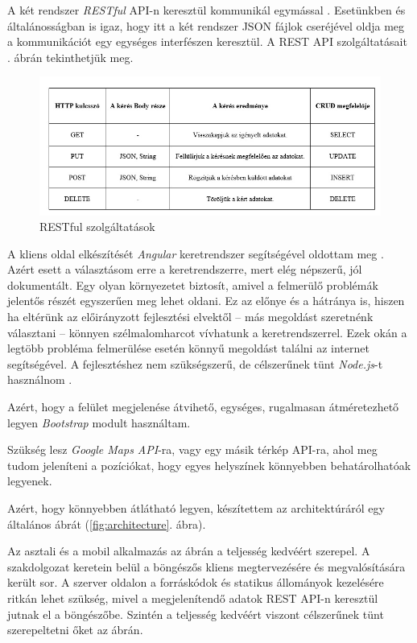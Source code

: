
A két rendszer \textit{RESTful} API-n keresztül kommunikál egymással \cite{8}. Esetünkben és általánosságban is igaz, hogy itt a két rendszer JSON fájlok cseréjével oldja meg a kommunikációt egy egységes interfészen keresztül.
A REST API szolgáltatásait . ábrán tekinthetjük meg.

\begin{figure}
\centering
\includegraphics[scale=0.75]{kepek/rest.jpg}
\caption{RESTful szolgáltatások}
\label{fig:rest}
\end{figure}


A kliens oldal elkészítését \textit{Angular} keretrendszer segítségével oldottam meg \cite{4}. Azért esett a választásom erre a keretrendszerre, mert elég népszerű, jól dokumentált. Egy olyan környezetet biztosít, amivel a felmerülő problémák jelentős részét egyszerűen meg lehet oldani. Ez az előnye és a hátránya is, hiszen ha eltérünk az előirányzott fejlesztési elvektől -- más megoldást szeretnénk választani -- könnyen szélmalomharcot vívhatunk a keretrendszerrel. Ezek okán a legtöbb probléma felmerülése esetén könnyű megoldást találni az internet segítségével. A fejlesztéshez nem szükségszerű, de célszerűnek tünt \textit{Node.js}-t használnom \cite{17}.

Azért, hogy a felület megjelenése átvihető, egységes, rugalmasan átméretezhető legyen \textit{Bootstrap} modult használtam.

Szükség lesz \textit{Google Maps API}-ra, vagy egy másik térkép API-ra, ahol meg tudom jeleníteni a pozíciókat, hogy egyes helyszínek könnyebben behatárolhatóak legyenek.


Azért, hogy könnyebben átlátható legyen, készítettem az architektúráról egy általános ábrát (\ref{fig:architecture}. ábra).

Az asztali és a mobil alkalmazás az ábrán a teljesség kedvéért szerepel. A szakdolgozat keretein belül a böngészős kliens megtervezésére és megvalósítására került sor. A szerver oldalon a forráskódok és statikus állományok kezelésére ritkán lehet szükség, mivel a megjelenítendő adatok REST API-n keresztül jutnak el a böngészőbe. Szintén a teljesség kedvéért viszont célszerűnek tünt szerepeltetni őket az ábrán.

